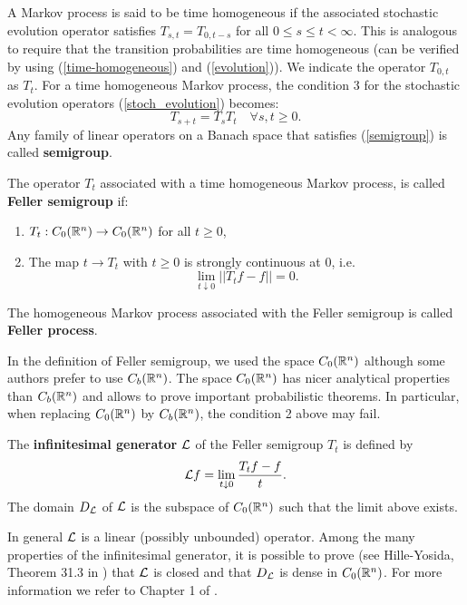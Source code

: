 \noindent
A Markov process is said to be time homogeneous if the associated stochastic evolution operator satisfies $T_{s,t} = T_{0,t-s}$ for all $0 \leq s \leq t < \infty$.
This is analogous to require that the transition probabilities are time homogeneous 
(can be verified by using (\ref{time-homogeneous}) and (\ref{evolution})). 
We indicate the operator $T_{0,t}$ as $T_t$. For a time homogeneous Markov process, the condition 3 for the stochastic evolution operators (\ref{stoch_evolution}) becomes:
\begin{equation}\label{semigroup}
 T_{s+t} = T_s T_t  \quad \forall s,t \geq 0. 
\end{equation}
Any family of linear operators on a Banach space that satisfies (\ref{semigroup}) is called \textbf{semigroup}.

\begin{Definition}
The operator $T_t$ associated with a time homogeneous Markov process, is called \textbf{Feller semigroup} if:
\begin{enumerate}
 \item $T_t : C_0(\mathbb{R}^n) \to C_0(\mathbb{R}^n) $ for all $t \geq 0$,
 \item The map $t \to T_t $ with $t \geq 0$ is strongly continuous at 0, i.e. $$\lim_{t \downarrow 0} ||T_t f - f|| = 0.$$ 
\end{enumerate} 
\end{Definition}
The homogeneous Markov process associated with the Feller semigroup is called \textbf{Feller process}.

In the definition of Feller semigroup, we used the space $C_0(\mathbb{R}^n)$ although some authors prefer to use $C_b(\mathbb{R}^n)$. 
The space $C_0(\mathbb{R}^n)$ has nicer analytical properties than $C_b(\mathbb{R}^n)$ and allows to prove important probabilistic theorems.
In particular, when replacing $C_0(\mathbb{R}^n)$ by $C_b(\mathbb{R}^n)$, the condition 2 above may fail.

\begin{Definition}\label{Infinitesimal_generator_def}
The \textbf{infinitesimal generator} $\mathcal{L}$ of the Feller semigroup $T_t$ is defined by
\begin{equation}
 \mathcal{L} f =  \lim_{t \downarrow 0} \frac{T_t f - f}{t}.  
\end{equation}
The domain $D_{\mathcal{L}}$ of $\mathcal{L}$ is the subspace of $C_0(\mathbb{R}^n)$ such that the limit above exists. 
\end{Definition}
In general $\mathcal{L}$ is a linear (possibly unbounded) operator.
Among the many properties of the infinitesimal generator, it is possible to prove (see Hille-Yosida, Theorem 31.3 in \cite{Sato}) 
that $\mathcal{L}$ is closed and that $D_{\mathcal{L}}$ is dense in $C_0(\mathbb{R}^n)$.   
For more information we refer to Chapter 1 of \cite{EthierKurtz}.

